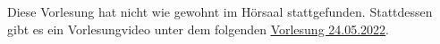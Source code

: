 Diese Vorlesung hat nicht wie gewohnt im Hörsaal stattgefunden. 
Stattdessen gibt es ein Vorlesungvideo unter dem folgenden 
\href{https://ls2-web.cs.tu-dortmund.de/~mamicoja/dap2/videos/lec_bfsdfs.mp4}{\underline{Vorlesung 24.05.2022}}. 